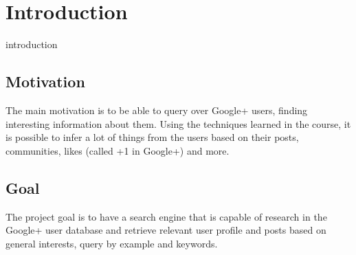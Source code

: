 \section{Introduction}
introduction
\subsection*{Motivation}
The main motivation is to be able to query over Google+ users, finding interesting information about them. Using the techniques learned in the course, it is possible to infer a lot of things from the users based on their posts, communities, likes (called +1 in Google+) and more.

\subsection*{Goal}
The project goal is to have a search engine that is capable of research in the Google+ user database and retrieve relevant user profile and posts based on general interests, query by example and keywords.